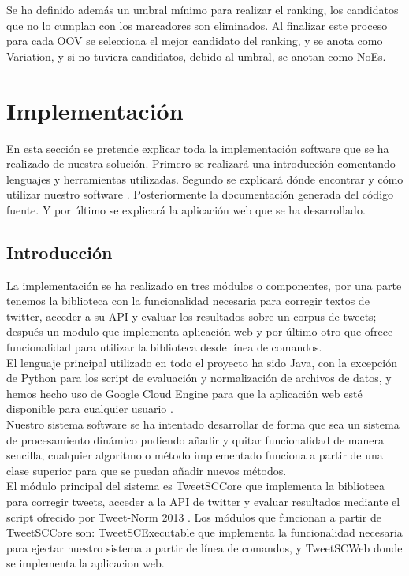 \documentclass[spanish,12pt, a4paper,twoside]{paper}
\let\oldsection\section
\def\section{\cleardoublepage\oldsection}
\begin{document}
Se ha definido además un umbral mínimo para realizar el ranking, los candidatos que no lo cumplan con los marcadores son eliminados. Al finalizar este proceso para cada OOV se selecciona el mejor candidato del ranking, y se anota como Variation, y si no tuviera candidatos, debido al umbral, se anotan como NoEs.

\section{Implementación}\label{sec:implementacion}
En esta sección se pretende explicar toda la implementación software que se ha realizado de nuestra solución. Primero se realizará una introducción comentando lenguajes y herramientas utilizadas. Segundo se explicará dónde encontrar y cómo utilizar nuestro software . Posteriormente la documentación generada del código fuente. Y por último se explicará la aplicación web que se ha desarrollado.

\subsection{Introducción}\label{sec:introduccion}
La implementación se ha realizado en tres módulos o componentes, por una parte tenemos la biblioteca con la funcionalidad necesaria para corregir textos de twitter, acceder a su API y evaluar los resultados sobre un corpus de tweets; después un modulo que implementa aplicación web y por último otro que ofrece funcionalidad para utilizar la biblioteca desde línea de comandos.\\

El lenguaje principal utilizado en todo el proyecto ha sido Java, con la excepción de Python para los script de evaluación y normalización de archivos de datos, y hemos hecho uso de Google Cloud Engine \cite{googlecloudengine} para que la aplicación web esté disponible para cualquier usuario \cite{tweetscweb:spellchecker}.\\

Nuestro sistema software se ha intentado desarrollar de forma que sea un sistema de procesamiento dinámico pudiendo añadir y quitar funcionalidad de manera sencilla, cualquier algoritmo o método implementado funciona a partir de una clase superior para que se puedan añadir nuevos métodos.\\

El módulo principal del sistema es TweetSCCore que implementa la biblioteca para corregir tweets, acceder a la API de twitter y evaluar resultados mediante el script ofrecido por Tweet-Norm 2013 \cite{alegria:2013}. Los módulos que funcionan a partir de TweetSCCore son: TweetSCExecutable que implementa la funcionalidad necesaria para ejectar nuestro sistema a partir de línea de comandos, y TweetSCWeb donde se implementa la aplicacion web.\\
\end{document}
